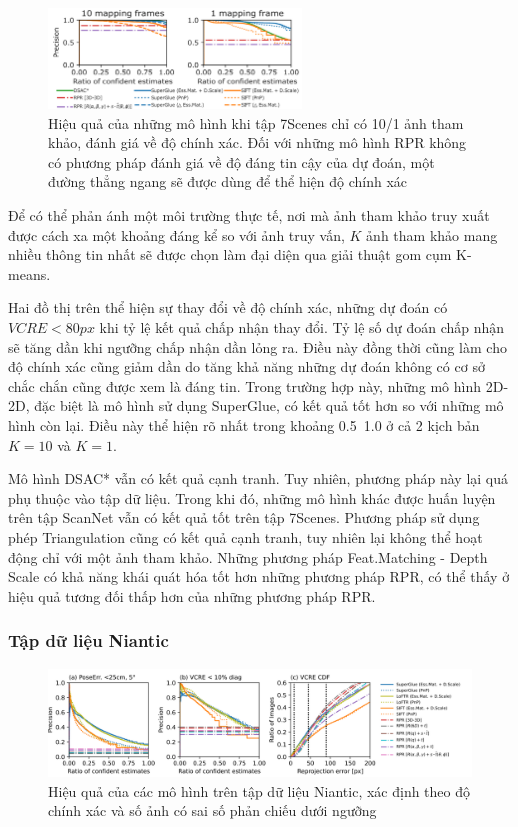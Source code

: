 \begin{figure}[H]
  \centering
  \includegraphics[width=0.6\textwidth]{pics/Proposal/partial_7scene.png}
  \caption[Hiệu quả của các mô hình khi giới hạn ảnh tham khảo]{Hiệu quả của những mô hình khi tập 7Scenes chỉ có 10/1 ảnh tham khảo, đánh giá về độ chính xác. Đối với những mô hình RPR không có phương pháp đánh giá về độ đáng tin cậy của dự đoán, một đường thẳng ngang sẽ được dùng để thể hiện độ chính xác}
\end{figure}

Để có thể phản ánh một môi trường thực tế, nơi mà ảnh tham khảo truy xuất được cách xa một khoảng đáng kể so với ảnh truy vấn, $K$ ảnh tham khảo mang nhiều thông tin nhất sẽ được chọn làm đại diện qua giải thuật gom cụm K-means.

Hai đồ thị trên thể hiện sự thay đổi về độ chính xác, những dự đoán có $VCRE<80px$ khi tỷ lệ kết quả chấp nhận thay đổi. Tỷ lệ số dự đoán chấp nhận sẽ tăng dần khi ngưỡng chấp nhận dần lỏng ra. Điều này đồng thời cũng làm cho độ chính xác cũng giảm dần do tăng khả năng những dự đoán không có cơ sở chắc chắn cũng được xem là đáng tin. Trong trường hợp này, những mô hình 2D-2D, đặc biệt là mô hình sử dụng SuperGlue, có kết quả tốt hơn so với những mô hình còn lại. Điều này thể hiện rõ nhất trong khoảng 0.5~1.0 ở cả 2 kịch bản $K=10$ và $K=1$. 

Mô hình DSAC* vẫn có kết quả cạnh tranh. Tuy nhiên, phương pháp này lại quá phụ thuộc vào tập dữ liệu. Trong khi đó, những mô hình khác được huấn luyện trên tập ScanNet vẫn có kết quả tốt trên tập 7Scenes. Phương pháp sử dụng phép Triangulation cũng có kết quả cạnh tranh, tuy nhiên lại không thể hoạt động chỉ với một ảnh tham khảo. Những phương pháp Feat.Matching - Depth Scale có khả năng khái quát hóa tốt hơn những phương pháp RPR, có thể thấy ở hiệu quả tương đối thấp hơn của những phương pháp RPR.

\subsubsection{Tập dữ liệu Niantic}

\begin{figure}[H]
  \centering
  \includegraphics[width=\textwidth]{pics/Proposal/all_niantic.png}
  \caption{Hiệu quả của các mô hình trên tập dữ liệu Niantic, xác định theo độ chính xác và số ảnh có sai số phản chiếu dưới ngưỡng}
\end{figure}

